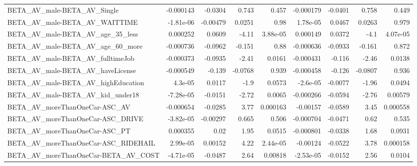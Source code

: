 \begin{tabular}{lrrrrrrrr}
BETA\_AV\_male-BETA\_AV\_Single                        &   -0.000143 &      -0.0304 &     0.743 &    0.457 &  -0.000179 &     -0.0401 &        0.758 &         0.449 \\
BETA\_AV\_male-BETA\_AV\_WAITTIME                      &   -1.81e-06 &     -0.00479 &    0.0251 &     0.98 &   1.78e-05 &      0.0467 &       0.0263 &         0.979 \\
BETA\_AV\_male-BETA\_AV\_age\_35\_less                   &    0.000252 &       0.0609 &     -4.11 & 3.88e-05 &   0.000149 &      0.0372 &         -4.1 &      4.07e-05 \\
BETA\_AV\_male-BETA\_AV\_age\_60\_more                   &   -0.000736 &      -0.0962 &    -0.151 &     0.88 &  -0.000636 &     -0.0933 &       -0.161 &         0.872 \\
BETA\_AV\_male-BETA\_AV\_fulltimeJob                   &   -0.000373 &      -0.0935 &     -2.41 &   0.0161 &  -0.000431 &      -0.116 &        -2.46 &        0.0138 \\
BETA\_AV\_male-BETA\_AV\_haveLicense                   &   -0.000549 &       -0.139 &   -0.0768 &    0.939 &  -0.000458 &      -0.126 &      -0.0807 &         0.936 \\
BETA\_AV\_male-BETA\_AV\_highEducation                 &     4.3e-05 &       0.0117 &      -1.9 &   0.0573 &   -2.6e-05 &     -0.0077 &        -1.96 &        0.0494 \\
BETA\_AV\_male-BETA\_AV\_kid\_under18                   &   -7.28e-05 &      -0.0151 &     -2.72 &   0.0065 &  -0.000266 &     -0.0594 &        -2.76 &       0.00579 \\
BETA\_AV\_moreThanOneCar-ASC\_AV                      &   -0.000654 &      -0.0285 &      3.77 & 0.000163 &   -0.00157 &     -0.0589 &         3.45 &      0.000558 \\
BETA\_AV\_moreThanOneCar-ASC\_DRIVE                   &   -3.82e-05 &     -0.00297 &     0.665 &    0.506 &  -0.000704 &     -0.0471 &         0.62 &         0.535 \\
BETA\_AV\_moreThanOneCar-ASC\_PT                      &    0.000355 &         0.02 &      1.95 &   0.0515 &  -0.000801 &     -0.0338 &         1.68 &        0.0931 \\
BETA\_AV\_moreThanOneCar-ASC\_RIDEHAIL                &    2.99e-05 &      0.00152 &      4.22 & 2.44e-05 &   -0.00124 &     -0.0522 &         3.78 &      0.000158 \\
BETA\_AV\_moreThanOneCar-BETA\_AV\_COST                &   -4.71e-05 &      -0.0487 &      2.64 &  0.00818 &  -2.53e-05 &     -0.0152 &         2.56 &        0.0104 \\

\end{tabular}
